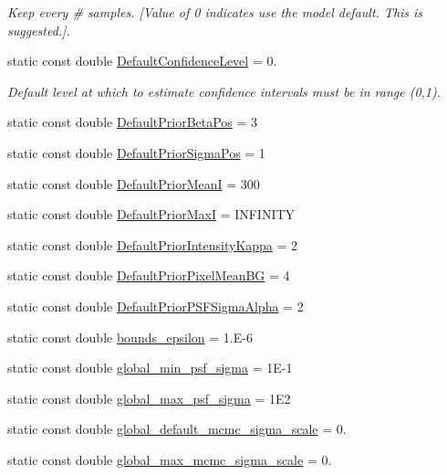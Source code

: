 \begin{DoxyCompactItemize}
\begin{DoxyCompactList}\small\item\em Keep every \# samples. \mbox{[}Value of 0 indicates use the model default. This is suggested.\mbox{]}. \end{DoxyCompactList}\item 
static const double \hyperlink{classmappel_1_1PointEmitterModel_ac57f7550589dcdbf3b6281e91d3e24ff}{Default\+Confidence\+Level} = 0.
\begin{DoxyCompactList}\small\item\em Default level at which to estimate confidence intervals must be in range (0,1). \end{DoxyCompactList}\item 
static const double \hyperlink{classmappel_1_1PointEmitterModel_a2771dc4415f351862619cd9671b5310d}{Default\+Prior\+Beta\+Pos} = 3
\item 
static const double \hyperlink{classmappel_1_1PointEmitterModel_a38b73a91eaae7b5fd0977b88ea844280}{Default\+Prior\+Sigma\+Pos} = 1
\item 
static const double \hyperlink{classmappel_1_1PointEmitterModel_a607fcdea787b0cc3c6ac8804d378d1b1}{Default\+Prior\+MeanI} = 300
\item 
static const double \hyperlink{classmappel_1_1PointEmitterModel_a4ad3422744bdac162e905d5615bf5b66}{Default\+Prior\+MaxI} = I\+N\+F\+I\+N\+I\+TY
\item 
static const double \hyperlink{classmappel_1_1PointEmitterModel_a03d9f90c130df2d42d0d31c9337e914c}{Default\+Prior\+Intensity\+Kappa} = 2
\item 
static const double \hyperlink{classmappel_1_1PointEmitterModel_a72efb3ee01fa548683d510288266fea5}{Default\+Prior\+Pixel\+Mean\+BG} = 4
\item 
static const double \hyperlink{classmappel_1_1PointEmitterModel_a2b06111eaa1ff284851c2e67a3827220}{Default\+Prior\+P\+S\+F\+Sigma\+Alpha} = 2
\item 
static const double \hyperlink{classmappel_1_1PointEmitterModel_ac987a119137b85a27704b1c40e3fab8c}{bounds\+\_\+epsilon} = 1.\+E-\/6
\item 
static const double \hyperlink{classmappel_1_1PointEmitterModel_a77d0ca98d77cb8b94117ece2a5b182a4}{global\+\_\+min\+\_\+psf\+\_\+sigma} = 1\+E-\/1
\item 
static const double \hyperlink{classmappel_1_1PointEmitterModel_a5e79dba8966c25c4e9c675cd1a2cab70}{global\+\_\+max\+\_\+psf\+\_\+sigma} = 1\+E2
\item 
static const double \hyperlink{classmappel_1_1MCMCAdaptorBase_a44cebca0e27135c854fa8430d2d89929}{global\+\_\+default\+\_\+mcmc\+\_\+sigma\+\_\+scale} = 0.
\item 
static const double \hyperlink{classmappel_1_1MCMCAdaptorBase_aebc93881ca351e67de867238a62579eb}{global\+\_\+max\+\_\+mcmc\+\_\+sigma\+\_\+scale} = 0.
\end{DoxyCompactItemize}
